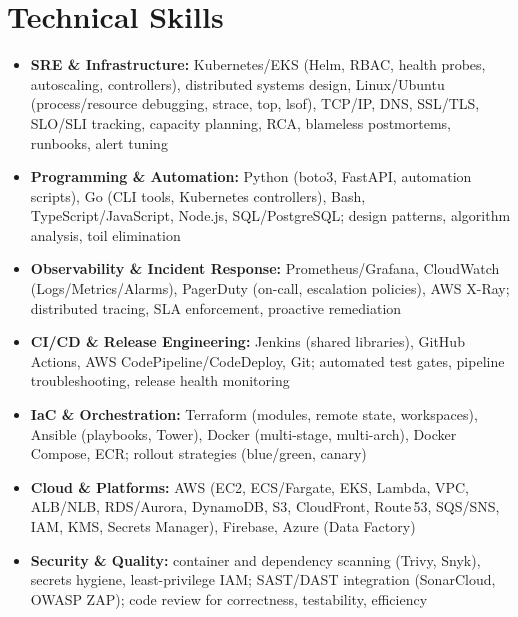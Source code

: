 \documentclass[10pt,a4paper]{article}
\begin{document}
\section*{Technical Skills}
\begin{itemize}
  \item \textbf{SRE \& Infrastructure:} Kubernetes/EKS (Helm, RBAC, health probes, autoscaling, controllers), distributed systems design, Linux/Ubuntu (process/resource debugging, strace, top, lsof), TCP/IP, DNS, SSL/TLS, SLO/SLI tracking, capacity planning, RCA, blameless postmortems, runbooks, alert tuning
  \item \textbf{Programming \& Automation:} Python (boto3, FastAPI, automation scripts), Go (CLI tools, Kubernetes controllers), Bash, TypeScript/JavaScript, Node.js, SQL/PostgreSQL; design patterns, algorithm analysis, toil elimination
  \item \textbf{Observability \& Incident Response:} Prometheus/Grafana, CloudWatch (Logs/Metrics/Alarms), PagerDuty (on-call, escalation policies), AWS X-Ray; distributed tracing, SLA enforcement, proactive remediation
  \item \textbf{CI/CD \& Release Engineering:} Jenkins (shared libraries), GitHub Actions, AWS CodePipeline/CodeDeploy, Git; automated test gates, pipeline troubleshooting, release health monitoring
  \item \textbf{IaC \& Orchestration:} Terraform (modules, remote state, workspaces), Ansible (playbooks, Tower), Docker (multi-stage, multi-arch), Docker Compose, ECR; rollout strategies (blue/green, canary)
  \item \textbf{Cloud \& Platforms:} AWS (EC2, ECS/Fargate, EKS, Lambda, VPC, ALB/NLB, RDS/Aurora, DynamoDB, S3, CloudFront, Route\,53, SQS/SNS, IAM, KMS, Secrets Manager), Firebase, Azure (Data Factory)
  \item \textbf{Security \& Quality:} container and dependency scanning (Trivy, Snyk), secrets hygiene, least-privilege IAM; SAST/DAST integration (SonarCloud, OWASP ZAP); code review for correctness, testability, efficiency
\end{itemize}

\end{document}
